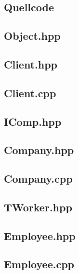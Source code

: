 \documentclass[12pt,naustrian,a4widepaper]{scrartcl}
\begin{document}
\clearpage
{}
\begin{landscape}

	\section{Quellcode}
	
	\subsection{Object.hpp}
	
	\clearpage
	\subsection{Client.hpp}
	
	\clearpage
	\subsection{Client.cpp}
	
	
	\clearpage
	\subsection{IComp.hpp}
	
	
	\clearpage
	\subsection{Company.hpp}
	
	\clearpage
	\subsection{Company.cpp}
	
	
	\clearpage
	\subsection{TWorker.hpp}
	
	
	\clearpage
	\subsection{Employee.hpp}
	
	\clearpage
	\subsection{Employee.cpp}
	
	

\end{landscape}
\end{document}
